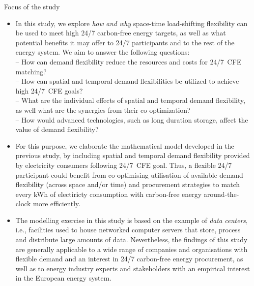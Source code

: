 \begin{frame}{Focus of the study}

  {\footnotesize
  \begin{itemize}
    \vspace{-0.2cm}
    \item In this study, we explore \textit{how and why} space-time load-shifting flexibility can be used to meet high 24/7 carbon-free energy targets, as well as what potential benefits it may offer to 24/7 participants and to the rest of the energy system. We aim to answer the following questions: \\

    \vspace{0.1cm}
    -- How can demand flexibility reduce the \alert{resources} and \alert{costs} for 24/7~CFE matching?\\ 
    -- How can spatial and temporal demand flexibilities be utilized to achieve high 24/7~CFE goals?\\
    -- What are the \alert{individual effects} of spatial and temporal demand flexibility, as well what are the synergies from their co-optimization? \\
    -- How would advanced technologies, such as long duration storage, affect \alert{the value of demand flexibility}?

    \item For this purpose, we elaborate the mathematical model developed in the previous study, by including spatial and temporal demand flexibility provided by electricity consumers following 24/7~CFE goal. Thus, a flexible 24/7 participant could benefit from co-optimising utilisation of available demand flexibility (across space and/or time) and procurement strategies to match every kWh of electiricty consumption with carbon-free energy around-the-clock \alert{more efficiently}.
    
    \item The modelling exercise in this study is based on the example of \textit{data centers}, i.e., facilities used to house networked computer servers that store, process and distribute large amounts of data. Nevertheless, the findings of this study are generally applicable to a wide range of companies and organisations with flexible demand and an interest in 24/7 carbon-free energy procurement, as well as to energy industry experts and stakeholders with an empirical interest in the European energy system.

  \end{itemize}

  }
\end{frame}



